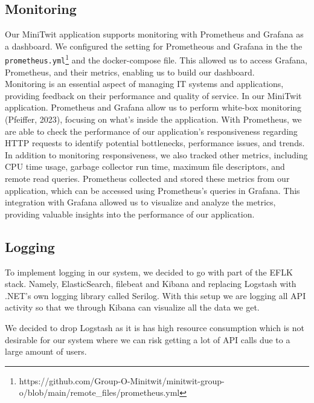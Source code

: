 \documentclass{article}
\begin{document}
\subsection{Monitoring}
Our MiniTwit application supports monitoring with Prometheus and Grafana as a dashboard. 
We configured the setting for Prometheous and Grafana in the the \verb|prometheus.yml|\footnote{https://github.com/Group-O-Minitwit/minitwit-group-o/blob/main/remote\_files/prometheus.yml} and the docker-compose file.
This allowed us to access Grafana, Prometheus, and their metrics, enabling us to build our dashboard.\\
Monitoring is an essential aspect of managing IT systems and applications, providing feedback on their performance and quality of service. In our MiniTwit application. Prometheus and Grafana allow us to perform white-box monitoring (Pfeiffer, 2023), focusing on what's inside the application. With Prometheus, we are able to check the performance of our application's responsiveness regarding HTTP requests to identify potential bottlenecks, performance issues, and trends.\\
In addition to monitoring responsiveness, we also tracked other metrics, including CPU time usage, garbage collector run time, maximum file descriptors, and remote read queries. Prometheus collected and stored these metrics from our application, which can be accessed using Prometheus's queries in Grafana. This integration with Grafana allowed us to visualize and analyze the metrics, providing valuable insights into the performance of our application.\\


\subsection{Logging}
To implement logging in our system, we decided to go with part of the EFLK stack. Namely, ElasticSearch, filebeat and Kibana and replacing Logstash with .NET’s own logging library called Serilog. With this setup we are logging all API activity so that we through Kibana can visualize all the data we get.

We decided to drop Logstash as it is has high resource consumption which is not desirable for our system where we can risk getting a lot of API calls due to a large amount of users.
\end{document}
